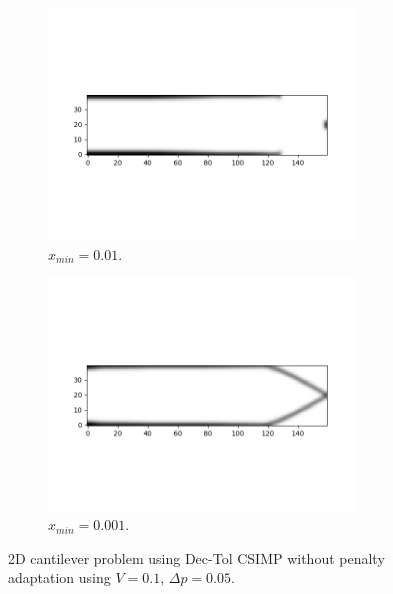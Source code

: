   

  \begin{figure}[H]
    \centering
    \begin{subfigure}{0.45\textwidth}
      \includegraphics[width=0.9\textwidth]{./images/adaptive_csimp/cantilever_dec_tol_csimp_01_0001_80_false_01_ip.png}
      \caption{$x_{min} = 0.01$.}
    \end{subfigure} \hfill
    \begin{subfigure}{0.45\textwidth}
      \includegraphics[width=0.9\textwidth]{./images/adaptive_csimp/cantilever_dec_tol_csimp_01_0001_80_false_001_ip.png}
      \caption{$x_{min} = 0.001$.}
    \end{subfigure}
    \caption{2D cantilever problem using Dec-Tol CSIMP without penalty adaptation using $V = 0.1$, $\Delta p = 0.05$.}
    \label{fig:high_xmin_solution_cantilever}
  \end{figure}


